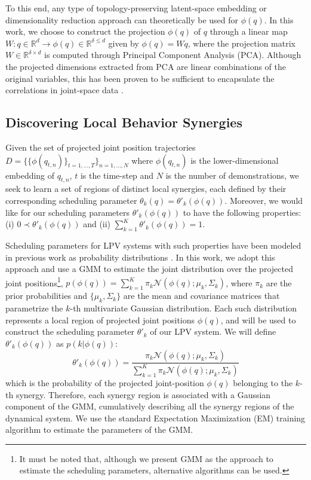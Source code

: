 \documentclass[letterpaper, 10 pt, conference,fleqn]{ieeeconf}
\begin{document}
To this end, any type of topology-preserving latent-space embedding or dimensionality reduction approach can theoretically be used for $\phi(q)$. In this work, we choose to construct the projection $\phi(q)$ of $q$ through a linear map $W:q \in \mathbb{R}^{d} \rightarrow \phi(q) \in \mathbb{R}^{\delta\leq d}$ given by $\phi(q) = Wq$, where the projection matrix $W \in \mathbb{R}^{\delta \times d}$ is computed through Principal Component Analysis (PCA). Although the projected dimensions extracted from PCA are linear combinations of the original variables, this has been proven to be sufficient to encapsulate the correlations in joint-space data \cite{calinon2005recognition}.

\nocite{*}

\subsection{Discovering Local Behavior Synergies}
Given the set of projected joint position trajectories $D=\{\{\phi(q_{t,n})\}_{t=1,\dots, T}\}_{n=1,\dots,N}$ where $\phi(q_{t,n})$ is the lower-dimensional embedding of $q_{t,n}$, $t$ is the time-step and $N$ is the number of demonstrations, we seek to learn a set of regions of distinct local synergies, each defined by their corresponding scheduling parameter $\theta_k(q) = \theta'_k(\phi(q))$. Moreover, we would like for our scheduling parameters $\theta'_k(\phi(q))$ to have the following properties: (i) $0 \prec \theta'_k(\phi(q))$ and (ii) $\sum_{k=1}^{K}\theta'_k(\phi(q)) = 1$.

Scheduling parameters for LPV systems with such properties have been modeled in previous work as probability distributions \cite{7439839, Salehian-RSS-16}. In this work, we adopt this approach and use a GMM to estimate the joint distribution over the projected joint positions\footnote{It must be noted that, although we present GMM as the approach to estimate the scheduling parameters, alternative algorithms can be used.}, $p(\phi(q)) = \sum_{k=1}^K\pi_k\mathcal{N}(\phi(q);\mu_k,\Sigma_k)$, where $\pi_k$ are the prior probabilities and $\{\mu_k,\Sigma_k\}$ are the mean and covariance matrices that parametrize the $k$-th multivariate Gaussian distribution. Each such distribution represents a local region of projected joint positions $\phi(q)$, and will be used to construct the scheduling parameter $\theta'_k$ of our LPV system. We will define $\theta'_k(\phi(q))$ as $p(k|\phi(q))$:
\begin{equation}
\label{eq:theta}
\theta'_k(\phi(q))= \frac{\pi_k\mathcal{N} (\phi(q); \mu_k, \Sigma_k)}{\sum_{k=1}^K \pi_k\mathcal{N} (\phi(q); \mu_k, \Sigma_k)}
\end{equation}
which is the probability of the projected joint-position $\phi(q)$ belonging to the $k$-th synergy. Therefore, each synergy region is associated with a Gaussian component of the GMM, cumulatively describing all the synergy regions of the dynamical system. We use the standard Expectation Maximization (EM) training algorithm to estimate the parameters of the GMM.
\end{document}
